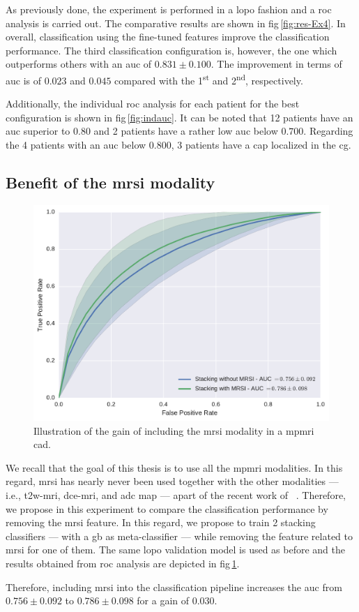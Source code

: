 As previously done, the experiment is performed in a \ac{lopo} fashion and a \ac{roc} analysis is carried out.
The comparative results are shown in \acs{fig}\,\ref{fig:res-Ex4}.
In overall, classification using the fine-tuned features improve the classification performance.
The third classification configuration is, however, the one which outperforms others with an \ac{auc} of $0.831 \pm 0.100$.
The improvement in terms of \ac{auc} is of $0.023$ and $0.045$ compared with the 1\textsuperscript{st} and 2\textsuperscript{nd}, respectively.

Additionally, the individual \ac{roc} analysis for each patient for the best configuration is shown in \acs{fig}\,\ref{fig:indauc}.
It can be noted that 12 patients have an \ac{auc} superior to $0.80$ and 2 patients have a rather low \ac{auc} below $0.700$.
Regarding the 4 patients with an \ac{auc} below $0.800$, 3 patients have a \ac{cap} localized in the \ac{cg}.

\subsection{Benefit of the \acs*{mrsi} modality}\label{subsec:chp6:exp-res:Ex5}

\begin{figure}
  \centering
  \includegraphics[width=0.7\linewidth]{6_pipeline/figures/exp-6/stacking_wt_mrsi.pdf}
  \caption{Illustration of the gain of including the \acs*{mrsi} modality in a \acs*{mpmri} \acs*{cad}.}
  \label{fig:resmrsigain}
\end{figure}

We recall that the goal of this thesis is to use all the \ac{mpmri} modalities.
In this regard, \ac{mrsi} has nearly never been used together with the other modalities --- i.e., \ac{t2w}-\ac{mri}, \ac{dce}-\ac{mri}, and \ac{adc} map --- apart of the recent work of \citeauthor{trigui2017automatic}~\cite{trigui2016classification,trigui2017automatic}.
Therefore, we propose in this experiment to compare the classification performance by removing the \ac{mrsi} feature.
In this regard, we propose to train 2 stacking classifiers --- with a \ac{gb} as meta-classifier --- while removing the feature related to \ac{mrsi} for one of them.
The same \ac{lopo} validation model is used as before and the results obtained from \ac{roc} analysis are depicted in \acs{fig}\,\ref{fig:resmrsigain}.

Therefore, including \ac{mrsi} into the classification pipeline increases the \ac{auc} from $0.756 \pm 0.092$ to $0.786 \pm 0.098$ for a gain of $0.030$.